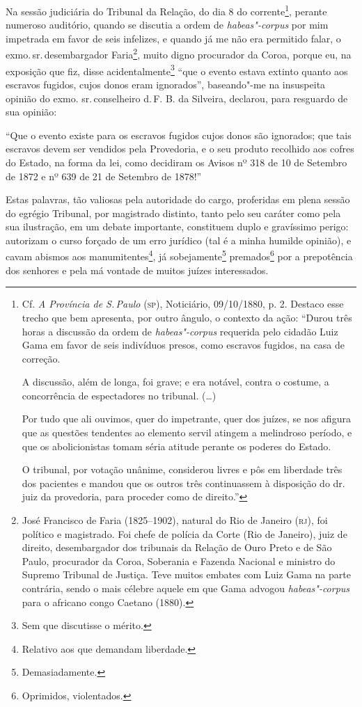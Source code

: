 Na sessão judiciária do Tribunal da Relação, do dia 8 do
corrente\footnote{Cf. \emph{A Província de S.\,Paulo} (\textsc{sp}), Noticiário,
  09/10/1880, p. 2. Destaco esse trecho que bem apresenta, por outro
  ângulo, o contexto da ação: ``Durou três horas a discussão da ordem de
  \emph{habeas"-corpus} requerida pelo cidadão Luiz Gama em favor de seis
  indivíduos presos, como escravos fugidos, na casa de correção.

  A discussão, além de longa, foi grave; e era notável, contra o
  costume, a concorrência de espectadores no tribunal. (\ldots{})

  Por tudo que ali ouvimos, quer do impetrante, quer dos juízes, se nos
  afigura que as questões tendentes ao elemento servil atingem a
  melindroso período, e que os abolicionistas tomam séria atitude
  perante os poderes do Estado.

  O tribunal, por votação unânime, considerou livres e pôs em liberdade
  três dos pacientes e mandou que os outros três continuassem à
  disposição do dr.\,juiz da provedoria, para proceder como de direito.''},
perante numeroso auditório, quando se discutia a ordem de
\emph{habeas"-corpus} por mim impetrada em favor de seis infelizes, e
quando já me não era permitido falar, o exmo.\,sr.\,desembargador
Faria\footnote{José Francisco de Faria (1825--1902), natural do Rio de
  Janeiro (\textsc{rj}), foi político e magistrado. Foi chefe de polícia da Corte
  (Rio de Janeiro), juiz de direito, desembargador dos tribunais da
  Relação de Ouro Preto e de São Paulo, procurador da Coroa, Soberania e
  Fazenda Nacional e ministro do Supremo Tribunal de Justiça. Teve
  muitos embates com Luiz Gama na parte contrária, sendo o mais célebre
  aquele em que Gama advogou \emph{habeas"-corpus} para o africano congo
  Caetano (1880).}, muito digno procurador da Coroa, porque eu, na
exposição que fiz, disse acidentalmente\footnote{Sem que discutisse o
  mérito.} ``que o evento estava extinto quanto aos escravos fugidos,
cujos donos eram ignorados'', baseando"-me na insuspeita opinião do exmo.
sr.\,conselheiro d.\,F. B. da Silveira, declarou, para resguardo de sua
opinião:

``Que o evento existe para os escravos fugidos cujos donos são ignorados;
que tais escravos devem ser vendidos pela Provedoria, e o seu produto
recolhido aos cofres do Estado, na forma da lei, como decidiram os
Avisos nº 318 de 10 de Setembro de 1872 e nº 639 de 21 de Setembro de
1878!''

Estas palavras, tão valiosas pela autoridade do cargo, proferidas em
plena sessão do egrégio Tribunal, por magistrado distinto, tanto pelo
seu caráter como pela sua ilustração, em um debate importante,
constituem duplo e gravíssimo perigo: autorizam o curso forçado de um
erro jurídico (tal é a minha humilde opinião), e cavam abismos aos
manumitentes\footnote{Relativo aos que demandam liberdade.}, já
sobejamente\footnote{Demasiadamente.} premados\footnote{Oprimidos,
  violentados.} por a
prepotência dos senhores e pela má vontade de muitos juízes
interessados.

